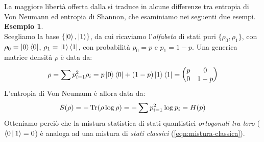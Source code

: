 \documentclass[../../InformazioneQuantistica.tex]{subfiles}
\begin{document}
La maggiore libertà offerta dalla \MQ si traduce in alcune differenze tra entropia di Von Neumann ed entropia di Shannon, che esaminiamo nei seguenti due esempi.\\

\textbf{Esempio 1}.\\
Scegliamo la base $\{\Ket{0}, \Ket{1}\}$, da cui ricaviamo l'\textit{alfabeto} di stati puri $\{\rho_0, \rho_1\}$, con $\rho_0 = \Ket{0}\Bra{0}$, $\rho_1 = \Ket{1}\Bra{1}$, con probabilità $p_0=p$ e $p_1=1-p$. Una generica matrice densità $\rho$ è data da:
\begin{align*}
\rho = \sum p_{i=1}^2 \rho_i = p\Ket{0}\Bra{0} + (1-p)\Ket{1}\Bra{1} = \begin{pmatrix} p & 0\\ 0 & 1-p \end{pmatrix}
\end{align*} 
L'entropia di Von Neumann è allora data da:
\begin{align*}
S(\rho) = -\operatorname{Tr}(\rho \log \rho) = -\sum p_{i=1}^2 \log p_i = H(p)
\end{align*}
Otteniamo perciò che la mistura statistica di stati quantistici \textit{ortogonali tra loro} ($\Braket{0|1} = 0$) è analoga ad una mistura di \textit{stati classici} (\ref{eqn:mistura-classica}). 
\end{document}
